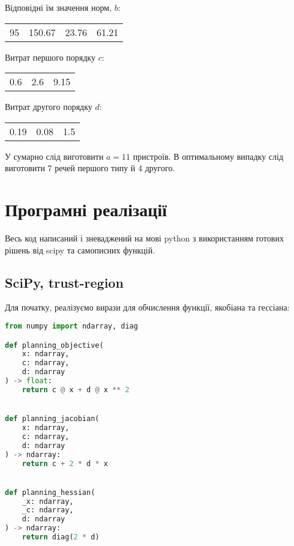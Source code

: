 \documentclass[12pt]{report}
\begin{document}
    Відповідні їм значення норм, $b$:

    \begin{center}
        \begin{tabular}{c c c c}
            95 & 150.67 & 23.76 & 61.21
        \end{tabular}
    \end{center}

    Витрат першого порядку $c$:

    \begin{center}
        \begin{tabular}{c c c}
            0.6 & 2.6 & 9.15
        \end{tabular}
    \end{center}

    Витрат другого порядку $d$:

    \begin{center}
        \begin{tabular}{c c c}
            0.19 & 0.08 & 1.5
        \end{tabular}
    \end{center}

    У сумарно слід виготовити $a = 11$ пристроїв.
    В оптимальному випадку слід виготовити 7 речей першого типу й 4 другого.

    \section*{Програмні реалізації}\label{sec:implementations}

    Весь код написаний і зневаджений на мові python з використанням готових рішень від scipy та самописних функцій.

    \subsection*{SciPy, trust-region}\label{subsec:scipy-trust-region}

    Для початку, реалізуємо вирази для обчислення функції, якобіана та гессіана:

    \begin{lstlisting}[language=Python,label={lst:scipy-trust-region1}]
from numpy import ndarray, diag

def planning_objective(
    x: ndarray,
    c: ndarray,
    d: ndarray
) -> float:
    return c @ x + d @ x ** 2


def planning_jacobian(
    x: ndarray,
    c: ndarray,
    d: ndarray
) -> ndarray:
    return c + 2 * d * x


def planning_hessian(
    _x: ndarray,
    _c: ndarray,
    d: ndarray
) -> ndarray:
    return diag(2 * d)
    \end{lstlisting}
\end{document}

